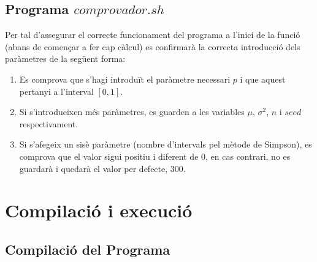 \documentclass[a4paper, 11pt]{article}
\begin{document}
\subsection{Programa $comprovador.sh$}
Per tal d’assegurar el correcte funcionament del programa a l’inici de la funció (abans de
començar a fer cap càlcul) es confirmarà la correcta introducció dels paràmetres de la següent
forma:

\begin{enumerate}
    \item Es comprova que s'hagi introduït el paràmetre necessari $p$ i que aquest pertanyi a l'interval $[0,1]$.
    \item Si s'introdueixen més paràmetres, es guarden a les variables $\mu$, $\sigma^2$, $n$ i $seed$ respectivament.
    \item Si s'afegeix un sisè paràmetre (nombre d'intervals pel mètode de Simpson), es comprova que el valor sigui positiu i diferent de $0$, en cas contrari, no es guardarà i quedarà el valor per defecte, $300$.
\end{enumerate}
\newpage
\section{Compilació i execució}
\subsection{Compilació del Programa} \label{compilacio}
\end{document}
